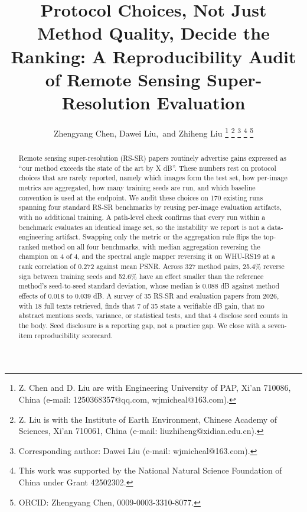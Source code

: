 \documentclass[journal,twoside,10pt]{IEEEtran}
\begin{document}
\title{Protocol Choices, Not Just Method Quality, Decide the Ranking: A Reproducibility Audit of Remote Sensing Super-Resolution Evaluation}

\author{Zhengyang Chen, Dawei Liu,~and Zhiheng Liu%
\thanks{Z. Chen and D. Liu are with Engineering University of PAP, Xi'an 710086, China (e-mail: 1250368357@qq.com, wjmicheal@163.com).}%
\thanks{Z. Liu is with the Institute of Earth Environment, Chinese Academy of Sciences, Xi'an 710061, China (e-mail: liuzhiheng@xidian.edu.cn).}%
\thanks{Corresponding author: Dawei Liu (e-mail: wjmicheal@163.com).}%
\thanks{This work was supported by the National Natural Science Foundation of China under Grant 42502302.}%
\thanks{ORCID: Zhengyang Chen, 0009-0003-3310-8077.}%
}

\maketitle

\begin{abstract}
Remote sensing super-resolution (RS-SR) papers routinely advertise gains expressed as ``our method exceeds the state of the art by X dB''. These numbers rest on protocol choices that are rarely reported, namely which images form the test set, how per-image metrics are aggregated, how many training seeds are run, and which baseline convention is used at the endpoint. We audit these choices on 170 existing runs spanning four standard RS-SR benchmarks by reusing per-image evaluation artifacts, with no additional training. A path-level check confirms that every run within a benchmark evaluates an identical image set, so the instability we report is not a data-engineering artifact. Swapping only the metric or the aggregation rule flips the top-ranked method on all four benchmarks, with median aggregation reversing the champion on 4 of 4, and the spectral angle mapper reversing it on WHU-RS19 at a rank correlation of 0.272 against mean PSNR. Across 327 method pairs, 25.4\% reverse sign between training seeds and 52.6\% have an effect smaller than the reference method's seed-to-seed standard deviation, whose median is 0.088 dB against method effects of 0.018 to 0.039 dB. A survey of 35 RS-SR and evaluation papers from 2026, with 18 full texts retrieved, finds that 7 of 35 state a verifiable dB gain, that no abstract mentions seeds, variance, or statistical tests, and that 4 disclose seed counts in the body. Seed disclosure is a reporting gap, not a practice gap. We close with a seven-item reproducibility scorecard.
\end{abstract}
\end{document}
